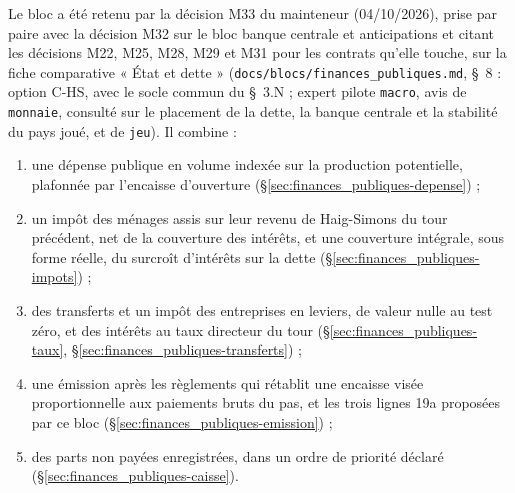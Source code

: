 \documentclass[11pt,a4paper]{article}
\begin{document}
\begin{proposee}
Le bloc a été retenu par la décision M33 du mainteneur (04/10/2026), prise par paire avec la décision M32 sur le bloc banque centrale et anticipations et citant les décisions M22, M25, M28, M29 et M31 pour les contrats qu'elle touche, sur la fiche comparative « État et dette » (\nolinkurl{docs/blocs/finances_publiques.md}, \S~8 : option C-HS, avec le socle commun du \S~3.N ; expert pilote \texttt{macro}, avis de \texttt{monnaie}, consulté sur le placement de la dette, la banque centrale et la stabilité du pays joué, et de \texttt{jeu}). Il combine :
\begin{enumerate}[label=(\alph*)]
\item une dépense publique en volume indexée sur la production potentielle, plafonnée par l'encaisse d'ouverture (\S\ref{sec:finances_publiques-depense}) ;
\item un impôt des ménages assis sur leur revenu de Haig-Simons du tour précédent, net de la couverture des intérêts, et une couverture intégrale, sous forme réelle, du surcroît d'intérêts sur la dette (\S\ref{sec:finances_publiques-impots}) ;
\item des transferts et un impôt des entreprises en leviers, de valeur nulle au test zéro, et des intérêts au taux directeur du tour (\S\ref{sec:finances_publiques-taux}, \S\ref{sec:finances_publiques-transferts}) ;
\item une émission après les règlements qui rétablit une encaisse visée proportionnelle aux paiements bruts du pas, et les trois lignes 19a proposées par ce bloc (\S\ref{sec:finances_publiques-emission}) ;
\item des parts non payées enregistrées, dans un ordre de priorité déclaré (\S\ref{sec:finances_publiques-caisse}).
\end{enumerate}

\end{proposee}
\end{document}
